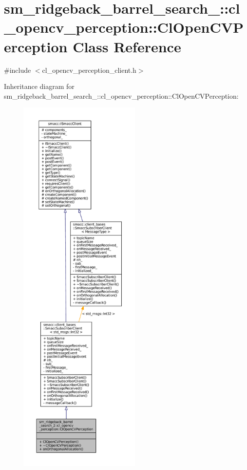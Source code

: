 \hypertarget{classsm__ridgeback__barrel__search__2_1_1cl__opencv__perception_1_1ClOpenCVPerception}{}\section{sm\+\_\+ridgeback\+\_\+barrel\+\_\+search\+\_\+:\+:cl\+\_\+opencv\+\_\+perception\+:\+:Cl\+Open\+C\+V\+Perception Class Reference}
\label{classsm__ridgeback__barrel__search__2_1_1cl__opencv__perception_1_1ClOpenCVPerception}


{\ttfamily \#include $<$cl\+\_\+opencv\+\_\+perception\+\_\+client.\+h$>$}



Inheritance diagram for sm\+\_\+ridgeback\+\_\+barrel\+\_\+search\+\_\+:\+:cl\+\_\+opencv\+\_\+perception\+:\+:Cl\+Open\+C\+V\+Perception\+:
\nopagebreak
\begin{figure}[H]
\begin{center}
\leavevmode
\includegraphics[height=550pt]{classsm__ridgeback__barrel__search__2_1_1cl__opencv__perception_1_1ClOpenCVPerception__inherit__graph}
\end{center}
\end{figure}


